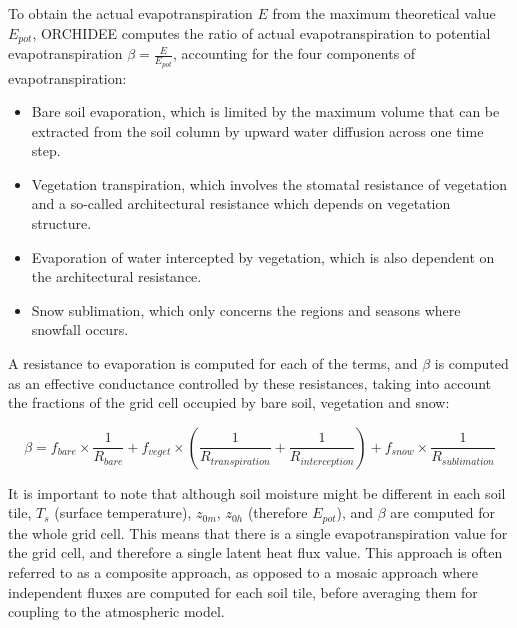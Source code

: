 To obtain the actual evapotranspiration $E$ from the maximum theoretical value $E_{pot}$, ORCHIDEE computes the ratio of actual evapotranspiration to potential evapotranspiration $\beta = \frac{E}{E_{pot}}$, accounting for the four components of evapotranspiration:  

\begin{itemize}
    \item Bare soil evaporation, which is limited by the maximum volume that can be extracted from the soil column by upward water diffusion across one time step.
    \item Vegetation transpiration, which involves the stomatal resistance of vegetation and a so-called architectural resistance which depends on vegetation structure.
    \item Evaporation of water intercepted by vegetation, which is also dependent on the architectural resistance.
    \item Snow sublimation, which only concerns the regions and seasons where snowfall occurs.
\end{itemize}

A resistance to evaporation is computed for each of the terms, and $\beta$ is computed as an effective conductance controlled by these resistances, taking into account the fractions of the grid cell occupied by bare soil, vegetation and snow:

\begin{equation}
    \beta = f_{bare} \times \frac{1}{R_{bare}} + f_{veget} \times ( \frac{1}{R_{transpiration}} + \frac{1}{R_{interception}} ) + f_{snow} \times  \frac{1}{R_{sublimation}}
\end{equation}

It is important to note that although soil moisture might be different in each soil tile, $T_s$ (surface temperature), $z_{0m}$, $z_{0h}$ (therefore $E_{pot}$), and $\beta$ are computed for the whole grid cell. This means that there is a single evapotranspiration value for the grid cell, and therefore a single latent heat flux value.
This approach is often referred to as a composite approach, as opposed to a mosaic approach where independent fluxes are computed for each soil tile, before averaging them for coupling to the atmospheric model. 

